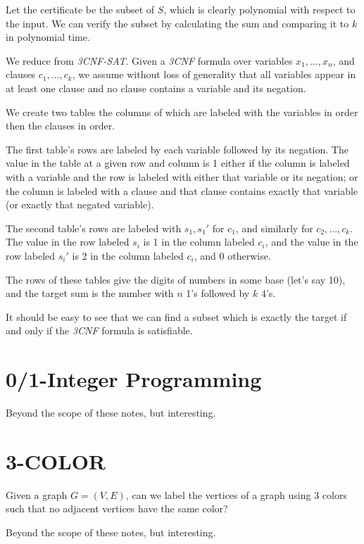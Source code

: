 Let the certificate be the subset of $S$, which is clearly polynomial
with respect to the input.  We can verify the subset by calculating
the sum and comparing it to $k$ in polynomial time.

We reduce from \emph{3CNF-SAT}.  Given a \emph{3CNF} formula over
variables $x_1, ..., x_n$, and clauses $c_1,...,c_k$, we assume
without loss of generality that all variables appear in at least one
clause and no clause contains a variable and its negation.

We create two tables the columns of which are labeled with the
variables in order then the clauses in order.  

The first table's rows are labeled by each variable followed by its
negation.  The value in the table at a given row and column is 1
either if the column is labeled with a variable and the row is labeled
with either that variable or its negation; or the column is labeled
with a clause and that clause contains exactly that variable (or
exactly that negated variable).

The second table's rows are labeled with $s_1,s_1'$ for $c_1$, and
similarly for $c_2,...,c_k$.  The value in the row labeled $s_i$ is 1
in the column labeled $c_i$, and the value in the row labeled $s_i'$
is 2 in the column labeled $c_i$, and 0 otherwise.

The rows of these tables give the digits of numbers in some base
(let's say 10), and the target sum is the number with $n$ 1's followed
by $k$ 4's.

It should be easy to see that we can find a subset which is exactly
the target if and only if the \emph{3CNF} formula is satisfiable.

\section{0/1-Integer Programming}

Beyond the scope of these notes, but interesting.

\section{3-COLOR}

Given a graph $G=(V,E)$, can we label the vertices of a graph using 3
colors such that no adjacent vertices have the same color?

Beyond the scope of these notes, but interesting.

